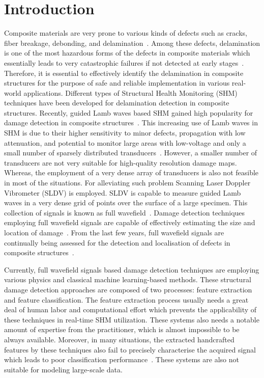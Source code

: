 \section{Introduction}
Composite materials are very prone to various kinds of defects such as cracks, fiber breakage, debonding, and delamination~\cite{ip2004delamination, smith2009composite}. Among these defects, delamination is one of the most hazardous forms of the defects in composite materials which essentially leads to very catastrophic failures if not detected at early stages~\cite{valdes1999delamination}. Therefore, it is essential to effectively identify the delamination in composite structures for the purpose of safe and reliable implementation in various real-world applications. Different types of Structural Health Monitoring (SHM) techniques have been developed for delamination detection in composite structures. Recently, guided Lamb waves based SHM gained high popularity for damage detection in composite structures~\cite{mitra2016guided}. This increasing use of Lamb waves in SHM is due to their higher sensitivity to minor defects, propagation with low attenuation, and potential to monitor large areas with low-voltage and only a small number of sparsely distributed transducers~\cite{alleyne1992interaction, giurgiutiu2003lamb, ihn2008pitch, mitra2016guided}. However, a smaller number of transducers are not very suitable for high-quality resolution damage maps. Whereas, the employment of a very dense array of transducers is also not feasible in most of the situations. For alleviating such problem Scanning Laser Doppler Vibrometer (SLDV) is employed. SLDV is capable to measure guided Lamb waves in a very dense grid of points over the surface of a large specimen. This collection of signals is known as full wavefield~\cite{radzienski2019damage}. Damage detection techniques employing full wavefield signals are capable of effectively estimating the size and location of damage~\cite{girolamo2018impact, kudela2018impact}. From the last few years, full wavefield signals are continually being assessed for the detection and localisation of defects in composite structures~\cite{sohn2011delamination, sohn2011automated, rogge2013characterization, kudela2018impact, radzienski2019damage}.

Currently, full wavefield signals based damage detection techniques are employing various physics and classical machine learning-based methods. These structural damage detection approaches are composed of two processes: feature extraction and feature classification. The feature extraction process usually needs a great deal of human labor and computational effort which prevents the applicability of these techniques in real-time SHM utilization. These systems also needs a notable amount of expertise from the practitioner, which is almost impossible to be always available. Moreover, in many situations, the extracted handcrafted features by these techniques also fail to precisely characterise the acquired signal which leads to poor classification performance~\cite{zhao2019deep, yuan2020machine}. These systems are also not suitable for modeling large-scale data.

